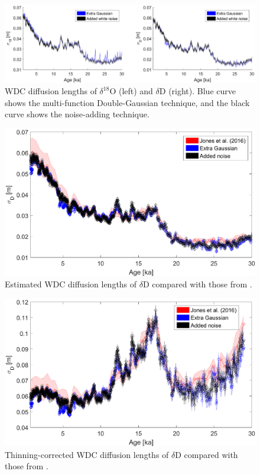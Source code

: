\documentclass[draft, jgrga]{AGUTeX}
\begin{document}
\begin{figure}
	\includegraphics[width=\linewidth]{WAIS_diffusion_adding_noise.eps}
	\caption{WDC diffusion lengths of $\delta^{18}$O (left) and $\delta$D (right). Blue curve shows the multi-function Double-Gaussian technique, and the black curve shows the noise-adding technique.} \label{WAIS_diffusion_adding_noise}
\end{figure}

\begin{figure}
	\includegraphics[width=.9\linewidth]{WAIS_diffusion_lengths.eps}
	\caption{Estimated WDC diffusion lengths of $\delta$D compared with those from \cite{Jones2017a}.} \label{WAIS_diffusion_lengths}
\end{figure}

\begin{figure}
	\includegraphics[width=.9\linewidth]{WAIS_diffusion_lengths_thinning_corr.eps}
	\caption{Thinning-corrected WDC diffusion lengths of $\delta$D  compared with those from \cite{Jones2017a}.} \label{WAIS_diffusion_lengths_thinning_corr}
\end{figure}
\end{document}
